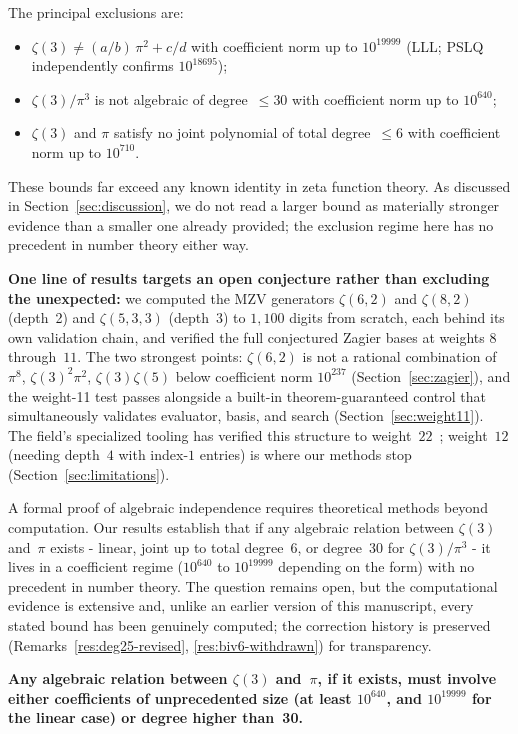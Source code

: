 \documentclass[12pt]{article}
\theoremstyle{definition}
\theoremstyle{remark}
\begin{document}
The principal exclusions are:
\begin{itemize}
  \item $\zeta(3)\ne(a/b)\,\pi^2+c/d$ with coefficient norm up to
    $10^{19999}$ (LLL; PSLQ independently confirms $10^{18695}$);
  \item $\zeta(3)/\pi^3$ is not algebraic of degree~$\le 30$ with
    coefficient norm up to $10^{640}$;
  \item $\zeta(3)$ and $\pi$ satisfy no joint polynomial of total
    degree~$\le 6$ with coefficient norm up to $10^{710}$.
\end{itemize}
These bounds far exceed any known identity in zeta function theory.  As
discussed in Section~\ref{sec:discussion}, we do not read a larger
bound as materially stronger evidence than a smaller one already
provided; the exclusion regime here has no precedent in number theory
either way.

\textbf{One line of results targets an open conjecture rather than
excluding the unexpected:} we computed the MZV generators
$\zeta(6,2)$ and $\zeta(8,2)$ (depth~2) and $\zeta(5,3,3)$
(depth~3) to $1{,}100$ digits from scratch, each behind its own
validation chain, and verified the full conjectured Zagier bases at
weights $8$ through~$11$.  The two strongest points: $\zeta(6,2)$ is
not a rational combination of $\pi^8$, $\zeta(3)^2\pi^2$,
$\zeta(3)\zeta(5)$ below coefficient norm $10^{237}$
(Section~\ref{sec:zagier}), and the weight-11 test passes alongside
a built-in theorem-guaranteed control that simultaneously validates
evaluator, basis, and search (Section~\ref{sec:weight11}).  The
field's specialized tooling has verified this structure to
weight~$22$~\cite{BBV2010}; weight~$12$ (needing depth~$4$ with
index-$1$ entries) is where our methods stop
(Section~\ref{sec:limitations}).

A formal proof of algebraic independence requires theoretical methods
beyond computation.  Our results establish that if any algebraic
relation between $\zeta(3)$ and~$\pi$ exists - linear, joint up to
total degree~6, or degree~30 for $\zeta(3)/\pi^3$ - it lives in a
coefficient regime ($10^{640}$ to $10^{19999}$ depending on the form)
with no precedent in number theory.  The question remains open, but
the computational evidence is extensive and, unlike an earlier version
of this manuscript, every stated bound has been genuinely computed;
the correction history is preserved
(Remarks~\ref{res:deg25-revised}, \ref{res:biv6-withdrawn}) for
transparency.

\medskip
\noindent\textbf{Any algebraic relation between $\zeta(3)$ and~$\pi$,
if it exists, must involve either coefficients of unprecedented size
(at least $10^{640}$, and $10^{19999}$ for the linear case) or degree
higher than~30.}
\end{document}
